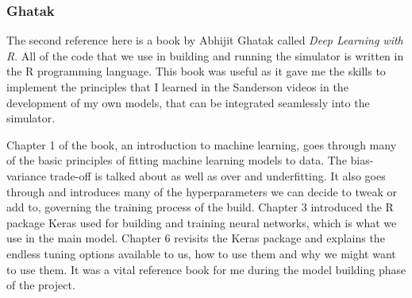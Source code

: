 \subsubsection{Ghatak}

The second reference here is a book by Abhijit Ghatak called \textit{Deep Learning with R}. \cite{ghatak_deep_2019} All of the code that we use in building and running the simulator is written in the R programming language. This book was useful as it gave me the skills to implement the principles that I learned in the Sanderson videos in the development of my own models, that can be integrated seamlessly into the simulator.

Chapter 1 of the book, an introduction to machine learning, goes through many of the basic principles of fitting machine learning models to data. The bias-variance trade-off is talked about as well as over and underfitting. It also goes through and introduces many of the hyperparameters we can decide to tweak or add to, governing the training process of the build. Chapter 3 introduced the R package Keras used for building and training neural networks, which is what we use in the main model. Chapter 6 revisits the Keras package and explains the endless tuning options available to us, how to use them and why we might want to use them. It was a vital reference book for me during the model building phase of the project.